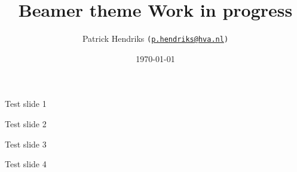 \documentclass{beamer}
\title{Beamer theme Work in progress}
\date{\today}
\author[Patrick Hendriks]{Patrick Hendriks \hspace{1em}\texttt{(\href{mailto:p.hendriks@hva.nl}{p.hendriks@hva.nl})}}
\begin{document}
\begin{frame}
\titlepage
\end{frame}


\begin{frame}{Test slide 1}

\end{frame}{Test slide 2}

\begin{frame}{Test slide 3}

\end{frame}

\begin{frame}{Test slide 4}

\end{frame}
\end{document}
